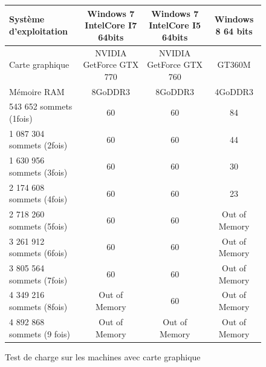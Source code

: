 \begin{figure}[h]
  \begin{changemargin}{-4cm}{-4cm}
    \centering
    \begin{tabular}{|l|c|c|c|}
      \hline
      Système d'exploitation & Windows 7 IntelCore I7 64bits & Windows 7 IntelCore I5 64bits & Windows 8 64 bits\\ \hline
      Carte graphique &  NVIDIA GetForce GTX 770 & NVIDIA GetForce GTX 760 & GT360M\\ \hline
      Mémoire RAM & 8GoDDR3 & 8GoDDR3 & 4GoDDR3 \\ \hline \hline
      543 652 sommets (1fois) & 60 & 60 & 84 \\ \hline
      1 087 304 sommets (2fois) & 60 & 60 & 44 \\ \hline
      1 630 956 sommets (3fois) & 60 & 60 & 30 \\ \hline
      2 174 608 sommets (4fois) & 60 & 60 & 23 \\ \hline
      2 718 260 sommets (5fois) & 60 & 60 & Out of Memory \\ \hline
      3 261 912 sommets (6fois) & 60 & 60 & Out of Memory \\ \hline
      3 805 564 sommets (7fois) & 60 & 60 & Out of Memory \\ \hline
      4 349 216 sommets (8fois) & Out of Memory & 60 & Out of Memory  \\ \hline
      4 892 868 sommets (9 fois) & Out of Memory & Out of Memory & Out of Memory \\ \hline
    \end{tabular}
  \end{changemargin}
  \caption{Test de charge sur les machines avec carte graphique}
  \label{tab:fps_cg}
\end{figure}

